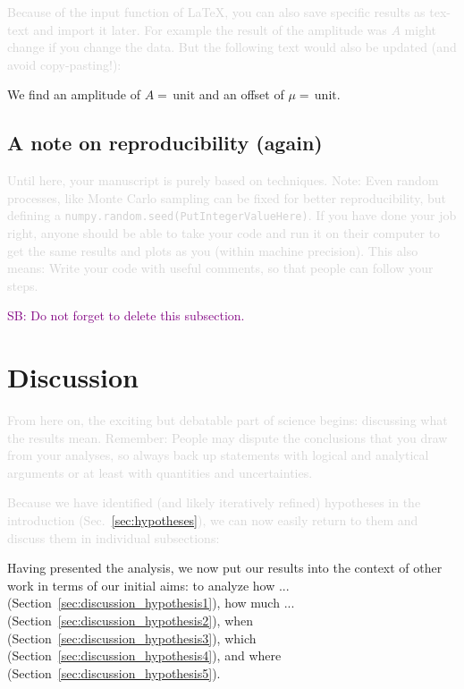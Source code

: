 \documentclass[twocolumn,apj,numberedappendix,appendixfloats]{openjournal}
\newcommand{\SB}[1]{{\textcolor{purple}{SB: #1}}}
\newcommand{\comment}[1]{\textcolor{lightgray}{#1}}
\begin{document}
\comment{Because of the input function of \LaTeX, you can also save specific results as tex-text and import it later. For example the result of the amplitude was $A$ might change if you change the data. But the following text would also be updated (and avoid copy-pasting!):}

We find an amplitude of $A = \,\mathrm{unit}$ and an offset of $\mu = \,\mathrm{unit}$.

\subsection{A note on reproducibility (again)}\label{sec:analysis_reproducibility}

\comment{Until here, your manuscript is purely based on techniques. Note: Even random processes, like Monte Carlo sampling can be fixed for better reproducibility, but defining a \texttt{numpy.random.seed(PutIntegerValueHere)}. If you have done your job right, anyone should be able to take your code and run it on their computer to get the same results and plots as you (within machine precision). This also means: Write your code with useful comments, so that people can follow your steps.}

\SB{Do not forget to delete this subsection.}

\clearpage
\section{Discussion} \label{sec:discussion}

\comment{From here on, the exciting but debatable part of science begins: discussing what the results mean. Remember: People may dispute the conclusions that you draw from your analyses, so always back up statements with logical and analytical arguments or at least with quantities and uncertainties.}

\comment{Because we have identified (and likely iteratively refined) hypotheses in the introduction (Sec.~\ref{sec:hypotheses}), we can now easily return to them and discuss them in individual subsections:}

Having presented the analysis, we now put our results into the context of other work in terms of our initial aims: to analyze how ... (Section~\ref{sec:discussion_hypothesis1}), how much ...  (Section~\ref{sec:discussion_hypothesis2}), when (Section~\ref{sec:discussion_hypothesis3}), which (Section~\ref{sec:discussion_hypothesis4}), and where (Section~\ref{sec:discussion_hypothesis5}).
\end{document}
